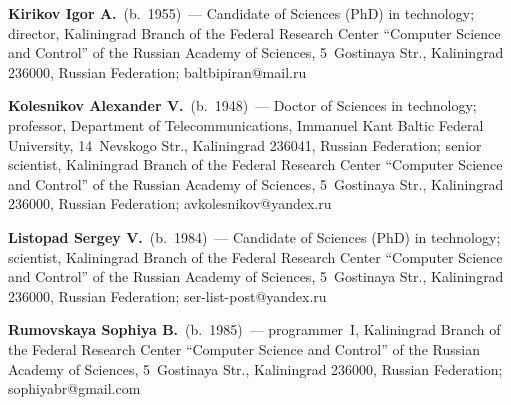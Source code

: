 \vspace*{-3pt}
    
  
  \Contr
  
  \noindent
  \textbf{Kirikov Igor A.}\ (b.\ 1955)~---
  Candidate of  Sciences (PhD) in technology; director, Kaliningrad Branch of the 
  Federal Research Center ``Computer Science and Control'' of the Russian Academy 
  of Sciences, 5~Gostinaya Str., Kaliningrad 236000,  Russian Federation; 
baltbipiran@mail.ru
  
  \pagebreak
  
  \noindent
  \textbf{Kolesnikov Alexander V.}\ (b.\ 1948)~---
  Doctor of Sciences in technology; professor, 
Department of Telecommunications, 
 Immanuel Kant Baltic Federal University, 14~Nevskogo Str., Kaliningrad 236041, Russian Federation; senior scientist, Kaliningrad Branch of 
  the Federal Research Center ``Computer Science and Control'' of the Russian 
  Academy of Sciences, 5~Gostinaya Str., Kaliningrad 236000,  Russian Federation; 
  avkolesnikov@yandex.ru
  
  \vspace*{4pt}
  
  \noindent
  \textbf{Listopad Sergey V.}\ (b.\ 1984)~---
  Candidate of  Sciences (PhD) in technology; scientist, Kaliningrad Branch of the 
  Federal Research Center ``Computer Science and Control'' of the Russian Academy 
  of Sciences, 5~Gostinaya Str., Kaliningrad 236000,  Russian Federation;   
ser-list-post@yandex.ru
  
  \vspace*{4pt}
  
  \noindent
  \textbf{Rumovskaya Sophiya B.}\ (b.\ 1985)~--- programmer~I, Kaliningrad Branch 
  of the Federal Research Center ``Computer Science and Control'' of the Russian 
  Academy of Sciences, 5~Gostinaya Str., Kaliningrad 236000,  Russian Federation; 
  sophiyabr@gmail.com
  \label{end\stat}
  
  
  \renewcommand{\bibname}{\protect\rm Литература}